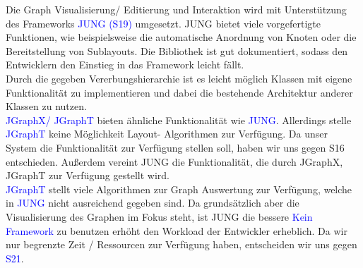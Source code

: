 \documentclass[enabledeprecatedfontcommands,fontsize=11pt,paper=a4,twoside]{scrartcl}
\newcounter{one}
\newcommand{\cb}[1]{{\textcolor{blue}{#1}}}
\begin{document}
	\begin{onehalfspace}
		Die Graph Visualisierung/ Editierung und Interaktion wird mit Unterstützung des Frameworks \cb{JUNG (S19)} umgesetzt. JUNG bietet viele vorgefertigte Funktionen, wie beispielsweise die automatische Anordnung von Knoten oder die Bereitstellung von Sublayouts. Die Bibliothek ist gut dokumentiert, sodass den Entwicklern den Einstieg in das Framework leicht fällt. \\
		Durch die gegeben Vererbungshierarchie ist es leicht möglich Klassen mit eigene Funktionalität zu implementieren und dabei die bestehende Architektur anderer Klassen zu nutzen. \\
		\cb{JGraphX/ JGraphT} bieten ähnliche Funktionalität wie \cb{JUNG}. Allerdings stelle \cb{JGraphT} keine Möglichkeit Layout- Algorithmen zur Verfügung. Da unser System die Funktionalität zur Verfügung stellen soll, haben wir uns gegen S16 entschieden. Außerdem vereint JUNG die Funktionalität, die durch JGraphX, JGraphT zur Verfügung gestellt wird.\\
		\cb{JGraphT} stellt viele Algorithmen zur Graph Auswertung zur Verfügung, welche in \cb{JUNG} nicht ausreichend gegeben sind. Da grundsätzlich aber die Visualisierung des Graphen im Fokus steht, ist JUNG die bessere 
		\cb{Kein Framework} zu benutzen erhöht den Workload der Entwickler erheblich. Da wir nur begrenzte Zeit / Ressourcen zur Verfügung haben, entscheiden wir uns gegen \cb{S21}.
	\end{onehalfspace}
	\newpage
\end{document}
